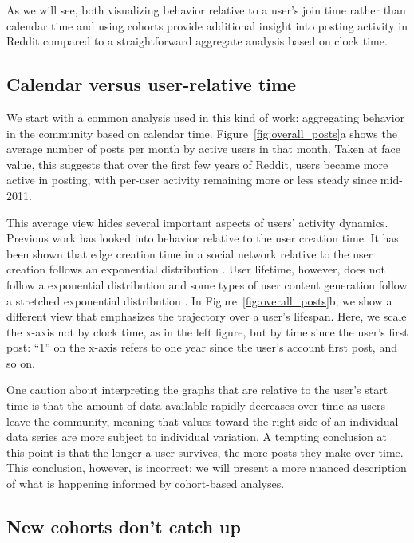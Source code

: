 As we will see, both visualizing behavior relative to a user's join time rather than calendar time and using cohorts provide additional insight into posting activity in Reddit compared to a straightforward aggregate analysis based on clock time.

\subsection{Calendar versus user-relative time}

We start with a common analysis used in this kind of work: aggregating behavior in the community based on calendar time.  Figure~\ref{fig:overall_posts}a shows the average number of posts per month by active users in that month.  Taken at face value, this suggests that over the first few years of Reddit, users became more active in posting, with per-user activity remaining more or less steady since mid-2011.

This average view hides several important aspects of users' activity dynamics. Previous work has looked into behavior relative to the user creation time. It has been shown that edge creation time in a social network relative to the user creation follows an exponential distribution \cite{Tomkins2008}. User lifetime, however, does not follow a exponential distribution and some types of user content generation follow a stretched exponential distribution \cite{Guo2009}. In Figure~\ref{fig:overall_posts}b, we show a different view that emphasizes the trajectory over a user's lifespan.  Here, we scale the x-axis not by clock time, as in the left figure, but by time since the user's first post: ``1'' on the x-axis refers to one year since the user's account first post, and so on.

One caution about interpreting the graphs that are relative to the user's start time is that the amount of data available rapidly decreases over time as users leave the community, meaning that values toward the right side of an individual data series are more subject to individual variation.  A tempting conclusion at this point is that the longer a user survives, the more posts they make over time.  This conclusion, however, is incorrect; we will present a more nuanced description of what is happening informed by cohort-based analyses.

\subsection{New cohorts don't catch up}

